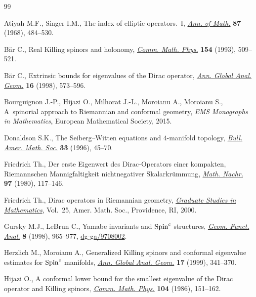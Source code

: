 \documentclass[10pt,a4paper]{amsart}
\numberwithin{equation}{section}
\theoremstyle{definition}
\begin{document}
\begin{thebibliography}{99}
\footnotesize \itemsep=0pt

Atiyah M.F., Singer I.M., The index of elliptic operators.~{I}, \href{http://dx.doi.org/10.2307/1970715}{\textit{Ann. of
  Math.}} \textbf{87} (1968), 484--530.

B{\"a}r C., Real {K}illing spinors and holonomy, \href{http://dx.doi.org/10.1007/BF02102106}{\textit{Comm. Math. Phys.}}
  \textbf{154} (1993), 509--521.

B{\"a}r C., Extrinsic bounds for eigenvalues of the {D}irac operator,
  \href{http://dx.doi.org/10.1023/A:1006550532236}{\textit{Ann. Global Anal. Geom.}} \textbf{16} (1998), 573--596.

Bourguignon J.-P., Hijazi O., Milhorat J.-L., Moroianu A., Moroianu S.,
  A~spinorial approach to Riemannian and conformal geometry, \textit{EMS Monographs in
  Mathematics}, European Mathematical Society, 2015.

Donaldson S.K., The {S}eiberg--{W}itten equations and {$4$}-manifold topology,
  \href{http://dx.doi.org/10.1090/S0273-0979-96-00625-8}{\textit{Bull. Amer. Math. Soc.}} \textbf{33} (1996), 45--70.

Friedrich Th., Der erste {E}igenwert des {D}irac-{O}perators einer kompakten,
  {R}iemannschen {M}annigfaltigkeit nichtnegativer {S}kalarkr\"ummung,
  \href{http://dx.doi.org/10.1002/mana.19800970111}{\textit{Math. Nachr.}} \textbf{97} (1980), 117--146.

Friedrich Th., Dirac operators in {R}iemannian geometry, \href{http://dx.doi.org/10.1090/gsm/025}{\textit{Graduate
  Studies in Mathematics}}, Vol.~25, Amer. Math. Soc., Providence, RI, 2000.

Gursky M.J., LeBrun C., Yamabe invariants and {${\rm Spin}^c$} structures,
  \href{http://dx.doi.org/10.1007/s000390050120}{\textit{Geom. Funct. Anal.}} \textbf{8} (1998), 965--977,
  \href{http://arxiv.org/abs/dg-ga/9708002}{dg-ga/9708002}.

Herzlich M., Moroianu A., Generalized {K}illing spinors and conformal
  eigenvalue estimates for {${\rm Spin}^c$} manifolds, \href{http://dx.doi.org/10.1023/A:1006546915261}{\textit{Ann. Global
  Anal. Geom.}} \textbf{17} (1999), 341--370.

Hijazi O., A conformal lower bound for the smallest eigenvalue of the {D}irac
  operator and {K}illing spinors, \href{http://dx.doi.org/10.1007/BF01210797}{\textit{Comm. Math. Phys.}} \textbf{104}
  (1986), 151--162.


\end{thebibliography}
\end{document}
